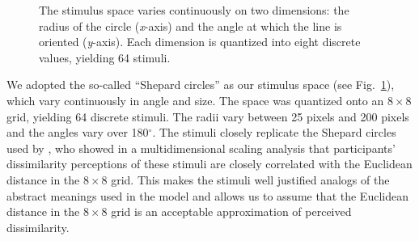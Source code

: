 \documentclass[doc,biblatex]{apa7}
\begin{document}
	\begin{figure}
	\vspace*{2pt}
	\caption{The stimulus space varies continuously on two dimensions: the radius of the circle (\textit{x}-axis) and the angle at which the line is oriented (\textit{y}-axis). Each dimension is quantized into eight discrete values, yielding 64 stimuli.}
	\label{fig08}
	\end{figure}

We adopted the so-called ``Shepard circles'' \parencite{Shepard:1964} as our stimulus space (see Fig.~\ref{fig08}), which vary continuously in angle and size. The space was quantized onto an $8 \times 8$ grid, yielding 64 discrete stimuli. The radii vary between 25 pixels and 200 pixels and the angles vary over 180$^{\circ}$. The stimuli closely replicate the Shepard circles used by \textcite[][Fig.~1, p.~787]{Canini:2014}, who showed in a multidimensional scaling analysis that participants' dissimilarity perceptions of these stimuli are closely correlated with the Euclidean distance in the $8 \times 8$ grid. This makes the stimuli well justified analogs of the abstract meanings used in the model and allows us to assume that the Euclidean distance in the $8 \times 8$ grid is an acceptable approximation of perceived dissimilarity.
\end{document}
